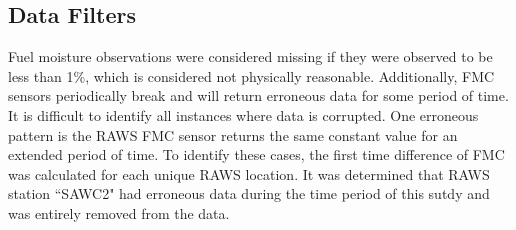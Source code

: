 \subsection{Data Filters}

Fuel moisture observations were considered missing if they were observed to be less than 1\%, which is considered not physically reasonable. Additionally, FMC sensors periodically break and will return erroneous data for some period of time. It is difficult to identify all instances where data is corrupted. One erroneous pattern is the RAWS FMC sensor returns the same constant value for an extended period of time. To identify these cases, the first time difference of FMC was calculated for each unique RAWS location. It was determined that RAWS station ``SAWC2" had erroneous data during the time period of this sutdy and was entirely removed from the data.



